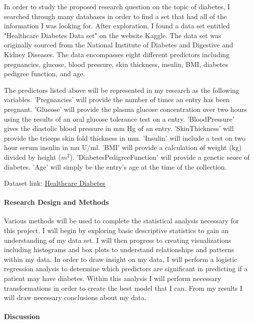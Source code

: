 \documentclass[12pt]{article}
\begin{document}
In order to study the proposed research question on the topic of diabetes, I searched through many databases in order to find a set that had all of the information I was looking for. After exploration, I found a data set entitled "Healthcare Diabetes Data set" on the website Kaggle. The data set was originally sourced from the National Institute of Diabetes and Digestive and Kidney Diseases. The data encompasses eight different predictors including pregnancies, glucose, blood pressure, skin thickness, insulin, BMI, diabetes pedigree function, and age.

The predictors listed above will be represented in my research as the following variables. 'Pregnancies' will provide the number of times an entry has been pregnant. 'Glucose' will provide the plasma glucose concentration over two hours using the results of an oral glucose tolerance test on a entry. 'BloodPressure' gives the diastolic blood pressure in mm Hg of an entry. 'SkinThickness' will provide the triceps skin fold thickness in mm. 'Insulin' will include a test on two hour serum insulin in mu U/ml. 'BMI' will provide a calculation of weight (kg) divided by height ($m^2$). 'DiabetesPedigreeFunction' will provide a genetic score of diabetes. 'Age' will simply be the entry's age at the time of the collection. 

Dataset link: \href{https://www.kaggle.com/datasets/nanditapore/healthcare-diabetes}{Healthcare Diabetes}


\paragraph{Research Design and Methods}
Various methods will be used to complete the statistical analysis necessary for this project. I will begin by exploring basic descriptive statistics to gain an understanding of my data set. I will then progress to creating visualizations including histograms and box plots to understand relationships and patterns within my data. In order to draw insight on my data, I will perform a logistic regression analysis to determine which predictors are significant in predicting if a patient may have diabetes. Within this analysis I will perform necessary transformations in order to create the best model that I can. From my results I will draw necessary conclusions about my data.


\paragraph{Discussion}
\end{document}
